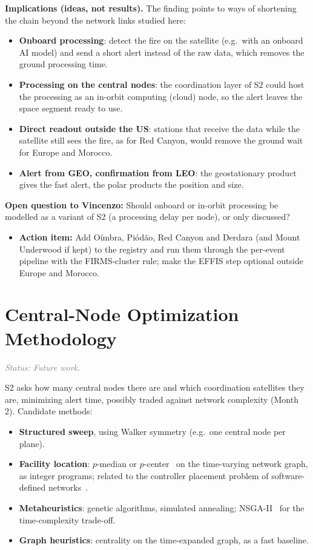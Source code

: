 \documentclass[11pt]{article}
\newcommand{\vincenzoq}[1]{\textcolor{vincenzoq}{\textbf{Open question to Vincenzo:}} #1}
\newcommand{\actionitem}[1]{\textcolor{todo}{\textbf{Action item:}} #1}
\newcommand{\status}[1]{\textit{\textcolor{gray}{Status: #1}}}
\begin{document}
\textbf{Implications (ideas, not results).} The finding points to ways of shortening the chain beyond the network links studied here:
\begin{itemize}[leftmargin=1.2cm]
    \item \textbf{Onboard processing}: detect the fire on the satellite (e.g.\ with an onboard AI model) and send a short alert instead of the raw data, which removes the ground processing time.
    \item \textbf{Processing on the central nodes}: the coordination layer of S2 could host the processing as an in-orbit computing (cloud) node, so the alert leaves the space segment ready to use.
    \item \textbf{Direct readout outside the US}: stations that receive the data while the satellite still sees the fire, as for Red Canyon, would remove the ground wait for Europe and Morocco.
    \item \textbf{Alert from GEO, confirmation from LEO}: the geostationary product gives the fast alert, the polar products the position and size.
\end{itemize}
\vincenzoq{Should onboard or in-orbit processing be modelled as a variant of S2 (a processing delay per node), or only discussed?}

\begin{itemize}[leftmargin=1.2cm]
    \item \actionitem{Add O\'imbra, Pi\'od\~ao, Red Canyon and Derdara (and Mount Underwood if kept) to the registry and run them through the per-event pipeline with the FIRMS-cluster rule; make the EFFIS step optional outside Europe and Morocco.}
\end{itemize}

\section{Central-Node Optimization Methodology}\label{sec:optim}

\status{Future work.}

S2 asks how many central nodes there are and which coordination satellites they are, minimizing alert time, possibly traded against network complexity (Month 2). Candidate methods:
\begin{itemize}[leftmargin=1.2cm]
    \item \textbf{Structured sweep}, using Walker symmetry (e.g.\ one central node per plane).
    \item \textbf{Facility location}: $p$-median or $p$-center~\cite{hakimi1964} on the time-varying network graph, as integer programs; related to the controller placement problem of software-defined networks~\cite{heller2012controller}.
    \item \textbf{Metaheuristics}: genetic algorithms, simulated annealing; NSGA-II~\cite{deb2002nsga2} for the time-complexity trade-off.
    \item \textbf{Graph heuristics}: centrality on the time-expanded graph, as a fast baseline.
\end{itemize}
\end{document}
